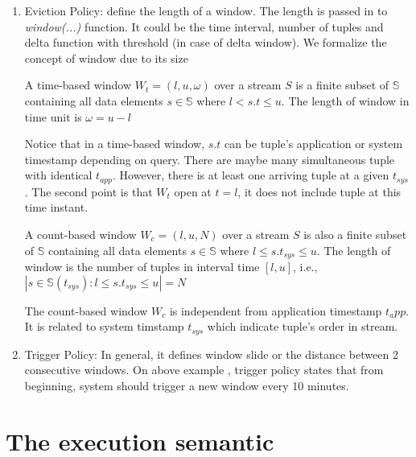 \begin{enumerate}

\item Eviction Policy: define the length of a window. The length is passed in to \textit{window(...)} function. It could be the time interval, number of tuples and delta function with threshold (in case of delta window).
We formalize the concept of window due to its size

\begin{defi}
A time-based window $W_{t} = (l,u,\omega)$ over a stream $S$ is a finite subset of  $\mathbb{S}$ containing all data elements $s \in \mathbb{S}$ where $l < s.t \leq u$. The length of window in time unit is $\omega = u-l$
\end{defi}
Notice that in a time-based window, $s.t$ can be tuple's application or system timestamp depending on query. There are maybe many simultaneous tuple with identical $t_{app}$. However, there is at least one arriving tuple at a given $t_{sys}$. The second point is that $W_t$ open at $t = l$, it does not include tuple at this time instant.

\begin{defi}
A count-based window $W_{c} = (l,u,N)$ over a stream $S$ is also a finite subset of  $\mathbb{S}$ containing all data elements $s \in \mathbb{S}$ where $l \leq s.t_{sys} \leq u$. The length of window is the number of tuples in interval time $[l, u]$, i.e., $|{s \in \mathbb{S}(t_{sys}): l \leq s.t_{sys} \leq u}| = N$
\end{defi}
The count-based window $W_{c}$ is independent from application timestamp $t_app$. It is related to system timstamp $t_{sys}$ which indicate tuple's order in stream. 


\item Trigger Policy: In general, it defines window slide or the distance between 2 consecutive windows. On above example , trigger policy states that from beginning, system should trigger a new window every 10 minutes.
\end{enumerate}


\section{The execution semantic}






